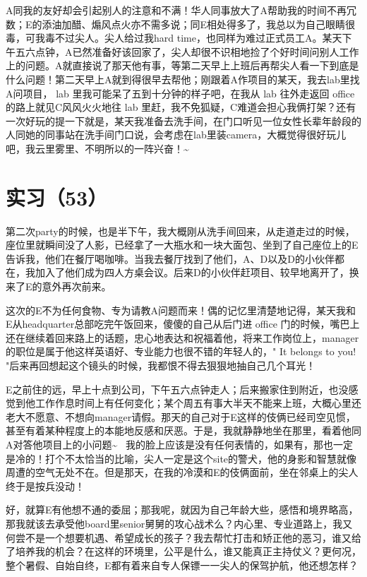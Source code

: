 \documentclass[12pt]{book}
\begin{document}
A同我的友好却会引起别人的注意和不满！华人同事放大了A帮助我的时间不再冗数；E的添油加醋、煽风点火亦不需多说；同E相处得多了，我总以为自己眼睛很毒，可我毒不过尖人。尖人给过我hard time，也同样为难过正式员工A。某天下午五六点钟，A已然准备好该回家了，尖人却很不识相地捡了个好时间问别人工作上的问题。A就直接说了那天他有事，等第二天早上上班后再帮尖人看一下到底是什么问题！第二天早上A就到得很早去帮他；刚跟着A作项目的某天，我去lab里找A问项目， lab 里我可能呆了五到十分钟的样子吧，在我从 lab 往外走返回 office 的路上就见C风风火火地往 lab 里赶，我不免狐疑，C难道会担心我俩打架？还有一次好玩的提一下就是，某天我准备去洗手间，在门口听见一位女性长辈年龄段的人同她的同事站在洗手间门口说，会考虑在lab里装camera，大概觉得很好玩儿吧，我云里雾里、不明所以的一阵兴奋！\textasciitilde{}~


\section{实习（53）}
\label{sec-5-56}

第二次party的时候，也是半下午，我大概刚从洗手间回来，从走道走过的时候，座位里就瞬间没了人影，已经拿了一大瓶水和一块大面包、坐到了自己座位上的E告诉我，他们在餐厅喝咖啡。当我去餐厅找到了他们，A、D以及D的小伙伴都在，我加入了他们成为四人方桌会议。后来D的小伙伴赶项目、较早地离开了，换来了E的意外再次前来。

这次的E不为任何食物、专为请教A问题而来！偶的记忆里清楚地记得，某天我和E从headquarter总部吃完午饭回来，傻傻的自己从后门进 office 门的时候，嘴巴上还在继续着回来路上的话题，忠心地表达和祝福着他，将来工作岗位上，manager的职位是属于他这样英语好、专业能力也很不错的年轻人的，" It belongs to you! "后来再回想起这个镜头的时候，我都恨不得去狠狠地抽自己几个耳光！

E之前住的远，早上十点到公司，下午五六点钟走人；后来搬家住到附近，也没感觉到他工作作息时间上有任何变化；某个周五有事大半天不能来上班，大概心里还老大不愿意、不想向manager请假。那天的自己对于E这样的伎俩已经司空见惯，甚至有着某种程度上的本能地反感和厌恶。于是，我就静静地坐在那里，看着他同A对答他项目上的小问题\textasciitilde{}~ 我的脸上应该是没有任何表情的，如果有，那也一定是冷的！打个不太恰当的比喻，尖人一定是这个site的警犬，他的身影和智慧就像周遭的空气无处不在。但是那天，在我的冷漠和E的伎俩面前，坐在邻桌上的尖人终于是按兵没动！

好，就算E有他想不通的委屈；那我呢，就因为自己年龄大些，感悟和境界略高，那我就该去承受他board里senior舅舅的攻心战术么？内心里、专业道路上，我又何尝不是一个想要机遇、希望成长的孩子？我去帮忙打击和矫正他的恶习，谁又给了培养我的机会？在这样的环境里，公平是什么，谁又能真正主持仗义？更何况，整个暑假、自始自终，E都有着来自专人保镖一一尖人的保驾护航，他还想怎样？
\end{document}
